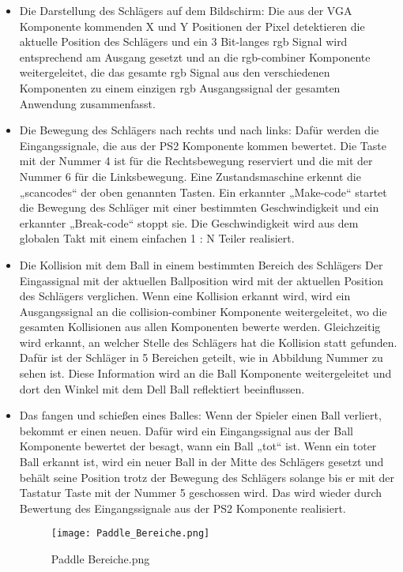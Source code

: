 \documentclass{scrartcl}
\begin{document}
\begin{itemize}
  \item Die Darstellung des Schlägers auf dem Bildschirm:
  Die aus der VGA Komponente kommenden X und Y Positionen der Pixel detektieren
  die aktuelle Position des Schlägers und ein 3 Bit-langes rgb Signal wird
  entsprechend am Ausgang gesetzt und an die rgb-combiner Komponente
  weitergeleitet, die das gesamte rgb Signal aus den verschiedenen Komponenten
  zu einem einzigen rgb Ausgangssignal der gesamten Anwendung zusammenfasst.
  \item Die Bewegung des Schlägers nach rechts und nach links:
  Dafür werden die Eingangssignale, die aus der PS2 Komponente kommen bewertet.
  Die Taste mit der Nummer 4 ist für die Rechtsbewegung reserviert und die mit
  der Nummer 6 für die Linksbewegung. Eine Zustandsmaschine erkennt die
  „scancodes“ der oben genannten Tasten. Ein erkannter „Make-code“ startet die
  Bewegung des Schläger mit einer bestimmten Geschwindigkeit und ein erkannter
  „Break-code“ stoppt sie. Die Geschwindigkeit wird aus dem globalen Takt mit
  einem einfachen 1 : N  Teiler realisiert.
  \item Die Kollision mit dem Ball in einem bestimmten Bereich des Schlägers
  Der Eingassignal mit der aktuellen Ballposition wird mit der aktuellen
  Position des Schlägers verglichen. Wenn eine Kollision erkannt wird, wird
  ein Ausgangssignal an die collision-combiner Komponente weitergeleitet, wo
  die gesamten Kollisionen aus allen Komponenten bewerte werden. Gleichzeitig
  wird erkannt, an welcher Stelle des Schlägers hat die Kollision statt
  gefunden. Dafür ist der Schläger in 5 Bereichen geteilt, wie in Abbildung
  Nummer zu sehen ist. Diese Information wird an die Ball Komponente
  weitergeleitet und dort den Winkel mit dem Dell Ball reflektiert
  beeinflussen.
  \item Das fangen und schießen eines Balles:
  Wenn der Spieler einen Ball verliert, bekommt er einen neuen. Dafür wird ein
  Eingangssignal aus der Ball Komponente bewertet der besagt, wann ein Ball „tot“
  ist. Wenn ein toter Ball erkannt ist, wird ein neuer Ball in der Mitte des
  Schlägers gesetzt und behält seine Position trotz der Bewegung des Schlägers
  solange bis er mit der Tastatur Taste mit der Nummer 5 geschossen wird. Das
  wird wieder durch Bewertung des Eingangssignale aus der PS2 Komponente
  realisiert.
  \begin{figure}[h!]
    \centering
    \texttt{[image: Paddle\_Bereiche.png]}
    \caption{Paddle Bereiche.png}
  \end{figure}
\end{itemize}
\end{document}
